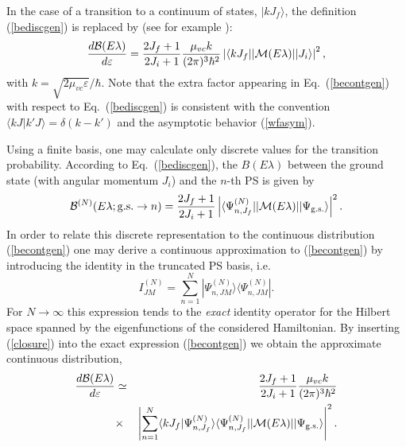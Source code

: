 \documentclass[preprint,12pt]{elsarticle}
\begin{document}
In the case of a transition to a continuum of states,  
$|k J_f \rangle$, the  definition (\ref{bediscgen}) is  replaced by
(see for example \cite{Typ05}): 
\begin{equation}
\label{becontgen}
\frac{d{\cal B}(E\lambda)}{d \varepsilon}   =  \frac{2 J_f +1 }{2
  J_i+1} \frac{\mu_{vc} k }{(2 \pi)^3 \hbar^2}    
  \left | \langle k J_f || \mathcal{M}(E\lambda) || J_i \rangle \right |^2  , 
\end{equation}
with $k=\sqrt{2 \mu_{vc}\varepsilon}/\hbar$. Note that the extra 
factor appearing in Eq.~(\ref{becontgen}) with respect to
Eq.~(\ref{bediscgen}) is consistent with the convention $\langle k J
| k' J \rangle = \delta(k-k')$ and the asymptotic behavior (\ref{wfasym}).

Using a finite basis, one may calculate only discrete values for the
transition probability.  According  
to Eq.~(\ref{bediscgen}), the $B(E\lambda)$ between the ground state (with angular momentum $J_i$) 
and the  $n$-th PS is given by
\begin{equation}
\label{beps}
{\cal B}^{(N)}(E\lambda; \mathrm{g.s.} \to n)=\frac{2 J_f+1}{2 J_i+1}
\left |
 \langle \Psi^{(N)}_{n,J_f} || \mathcal{M}(E\lambda) || \Psi_\mathrm{g.s.} \rangle  
\right |^2  . 
\end{equation}
In order to relate this 
discrete representation to the continuous distribution
(\ref{becontgen}) one may derive a continuous approximation to
(\ref{becontgen}) by introducing the identity in the truncated PS
basis, i.e. 
\begin{equation}
\label{closure}
I^{(N)}_{JM} = \sum_{n=1}^{N} | \Psi^{(N)}_{n,JM} \rangle  \langle  \Psi^{(N)}_{n,JM} |  .
\end{equation}
For $N \to \infty$ this expression tends to the \textit{exact}
identity operator for the Hilbert space spanned by the eigenfunctions
of the considered  
Hamiltonian. By inserting (\ref{closure}) into the exact expression
(\ref{becontgen}) we obtain the approximate continuous distribution, 
\begin{eqnarray}
\label{befold}
\frac{d{\cal B}(E\lambda)}{d\varepsilon} & \simeq  & \frac{2 J_f +1
}{2 J_i+1}  \frac{\mu_{vc} k }{(2 \pi)^3 \hbar^2} \nonumber \\  
& \times &  \left | \sum_{n=1}^{N}\langle  k J_f  | \Psi^{(N)}_{n,J_f} \rangle  
\langle  \Psi^{(N)}_{n,J_f} || \mathcal{M}(E\lambda) ||
\Psi_\mathrm{g.s.} \rangle   \right |^2 . \nonumber \\ 
\end{eqnarray}
\end{document}
